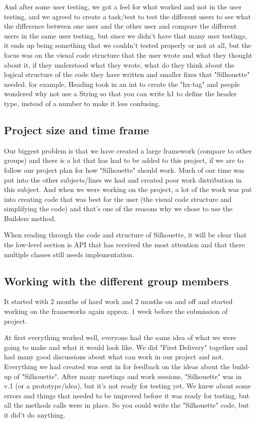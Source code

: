 \documentclass[12pt]{article}
\begin{document}
    And after some user testing, we got a feel for what worked and not in the user testing, and we agreed to create a task/test to test the different users to see what the difference between one user and the other user and compare the different users in the same user testing, but since we didn't have that many user testings, it ends up being something that we couldn’t tested properly or not at all, but the focus was on the visual code structure that the user wrote and what they thought about it, if they understood what they wrote, what do they think about the logical structure of the code they have written and smaller fixes that "Silhouette" needed. for example, Heading took in an int to create the "hx-tag" and people wondered why not use a String so that you can write h1 to define the header type, instead of a number to make it less confusing.

    \subsection{Project size and time frame}
    Our biggest problem is that we have created a large framework (compare to other groups) and there is a lot that has had to be added to this project, if we are to follow our project plan for how "Silhouette" should work. Much of our time was put into the other subjects/lines we had and created poor work distribution in this subject. And when we were working on the project, a lot of the work was put into creating code that was best for the user (the visual code structure and simplifying the code) and that's one of the reasons why we chose to use the Builders method.

    When reading through the code and structure of Silhouette, it will be clear that the low-level section is API that has received the most attention and that there multiple classes still needs implementation. 

    \subsection{Working with the different group members}

    It started with 2 months of hard work and 2 months on and off and started working on the frameworks again approx. 1 week before the submission of project.

    At first everything worked well, everyone had the same idea of what we were going to make and what it would look like. We did "First Delivery" together and had many good discussions about what can work in our project and not. Everything we had created was sent in for feedback on the ideas about the build-up of "Silhouette". After many meetings and work sessions, "Silhouette" was in v.1 (or a prototype/idea), but it's not ready for testing yet. We knew about some errors and things that needed to be improved before it was ready for testing, but all the methods calls were in place. So you could write the "Silhouette" code, but it did't do anything.
\end{document}
